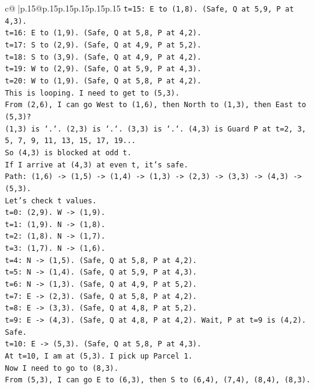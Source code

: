 \documentclass{article}
\begin{document}
{\begin{supertabular}{c@{$\;$}|p{.15\linewidth}@{}p{.15\linewidth}p{.15\linewidth}p{.15\linewidth}p{.15\linewidth}p{.15\linewidth}}
{{{\texttt{t=15: E to (1,8). (Safe, Q at 5,9, P at 4,3).} \\
\texttt{t=16: E to (1,9). (Safe, Q at 5,8, P at 4,2).} \\
\texttt{t=17: S to (2,9). (Safe, Q at 4,9, P at 5,2).} \\
\texttt{t=18: S to (3,9). (Safe, Q at 4,9, P at 4,2).} \\
\texttt{t=19: W to (2,9). (Safe, Q at 5,9, P at 4,3).} \\
\texttt{t=20: W to (1,9). (Safe, Q at 5,8, P at 4,2).} \\
\texttt{This is looping. I need to get to (5,3).} \\
\texttt{From (2,6), I can go West to (1,6), then North to (1,3), then East to (5,3)?} \\
\texttt{(1,3) is `.`. (2,3) is `.`. (3,3) is `.`. (4,3) is Guard P at t=2, 3, 5, 7, 9, 11, 13, 15, 17, 19...} \\
\texttt{So (4,3) is blocked at odd t.} \\
\texttt{If I arrive at (4,3) at even t, it's safe.} \\
\texttt{Path: (1,6) {-}> (1,5) {-}> (1,4) {-}> (1,3) {-}> (2,3) {-}> (3,3) {-}> (4,3) {-}> (5,3).} \\
\texttt{Let's check t values.} \\
\texttt{t=0: (2,9). W {-}> (1,9).} \\
\texttt{t=1: (1,9). N {-}> (1,8).} \\
\texttt{t=2: (1,8). N {-}> (1,7).} \\
\texttt{t=3: (1,7). N {-}> (1,6).} \\
\texttt{t=4: N {-}> (1,5). (Safe, Q at 5,8, P at 4,2).} \\
\texttt{t=5: N {-}> (1,4). (Safe, Q at 5,9, P at 4,3).} \\
\texttt{t=6: N {-}> (1,3). (Safe, Q at 4,9, P at 5,2).} \\
\texttt{t=7: E {-}> (2,3). (Safe, Q at 5,8, P at 4,2).} \\
\texttt{t=8: E {-}> (3,3). (Safe, Q at 4,8, P at 5,2).} \\
\texttt{t=9: E {-}> (4,3). (Safe, Q at 4,8, P at 4,2). Wait, P at t=9 is (4,2). Safe.} \\
\texttt{t=10: E {-}> (5,3). (Safe, Q at 5,8, P at 4,3).} \\
\texttt{At t=10, I am at (5,3). I pick up Parcel 1.} \\
\texttt{Now I need to go to (8,3).} \\
\texttt{From (5,3), I can go E to (6,3), then S to (6,4), (7,4), (8,4), (8,3).} \\
}}}
\end{supertabular}}
\end{document}
